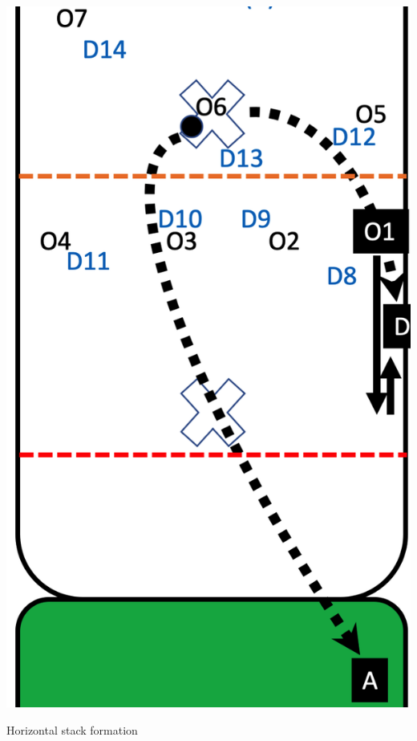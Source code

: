 \documentclass{tufte-handout}
\begin{document}
\begin{marginfigure}%
  \includegraphics[width=\linewidth]{O1-horizontal}
  \caption{Horizontal stack formation}
  \label{fig:O1-horizontal}
\end{marginfigure}
\end{document}
